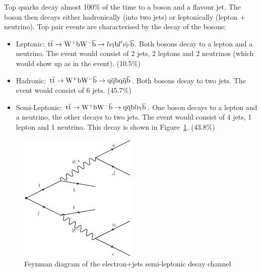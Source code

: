 Top quarks decay almost 100\% of the time to a \W boson and a \cPqb flavour jet. The \W boson then decays
either hadronically (into two jets) or leptonically (lepton + neutrino). Top pair events are characterised by the
decay of the \W bosons:
\begin{itemize}
  \item Leptonic: $\mathrm{t}\overline{\mathrm{t}} \rightarrow \mathrm{W}^{+} \mathrm{b} \mathrm{W}^{-} \overline{\mathrm{b}} \rightarrow l \nu_{l}\mathrm{b}
  l' \bar{\nu_{l'}} \overline{\mathrm{b}}$.
  Both \W bosons decay to a lepton and a neutrino. The event would consist of 2 jets, 2 leptons and 2
  neutrinos (which would show up as \met in the event). (10.5\%)
  \item Hadronic: $\mathrm{t}\overline{\mathrm{t}} \rightarrow \mathrm{W}^{+} \mathrm{b} \mathrm{W}^{-} \overline{\mathrm{b}} \rightarrow \mathrm{q} \overline{\mathrm{q}} \mathrm{b} \mathrm{q} \overline{\mathrm{q}}
  \overline{\mathrm{b}}$. Both \W bosons decay to two jets. The event would consist of 6 jets. (45.7\%)
  \item Semi-Leptonic: $\mathrm{t}\overline{\mathrm{t}} \rightarrow \mathrm{W}^{+} \mathrm{b} \mathrm{W}^{-} \overline{\mathrm{b}} \rightarrow \mathrm{q} \overline{\mathrm{q}} \mathrm{b} l \nu_{l}
  \overline{\mathrm{b}}$. One \W boson decays to a lepton and a neutrino, the other decays to two jets. The event would
  consist of 4 jets, 1 lepton and 1 neutrino. This decay is shown in Figure~\ref{fig:semileptonic_decay}.
  (43.8\%)
\end{itemize}

\begin{figure}[hbtp]
   \centering
     \includegraphics[width=0.5\textwidth]{Chapters/03_Theory/Images/semileptonic_decay}\hfill
     \caption{Feynman diagram of the electron+jets semi-leptonic \ttbar decay channel}
     \label{fig:semileptonic_decay}
\end{figure}

